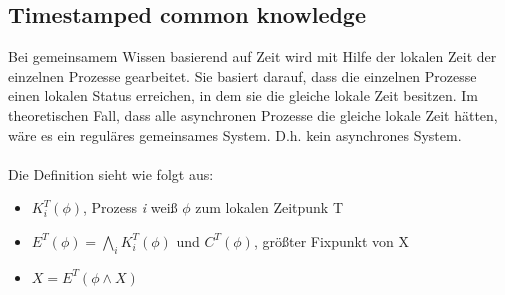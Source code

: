 \subsection{Timestamped common knowledge}
\label{timestamped_comm_know}
Bei gemeinsamem Wissen basierend auf Zeit wird mit Hilfe der lokalen Zeit der einzelnen Prozesse gearbeitet. Sie basiert darauf, dass die einzelnen Prozesse einen lokalen Status erreichen, in dem sie die gleiche lokale Zeit besitzen. Im theoretischen Fall, dass alle asynchronen Prozesse die gleiche lokale Zeit hätten, wäre es ein reguläres gemeinsames System. D.h. kein asynchrones System. \\\\
Die Definition sieht wie folgt aus:
\begin{itemize}
			\item $K^T_i(\phi)$, Prozess \textit{i} weiß $\phi$ zum lokalen Zeitpunk T
			\item $E^T(\phi) = \bigwedge_i K^T_i(\phi) $ und $C^T(\phi)$, größter Fixpunkt von X
			\item $X=E^T(\phi \wedge X)$

		\end{itemize}
